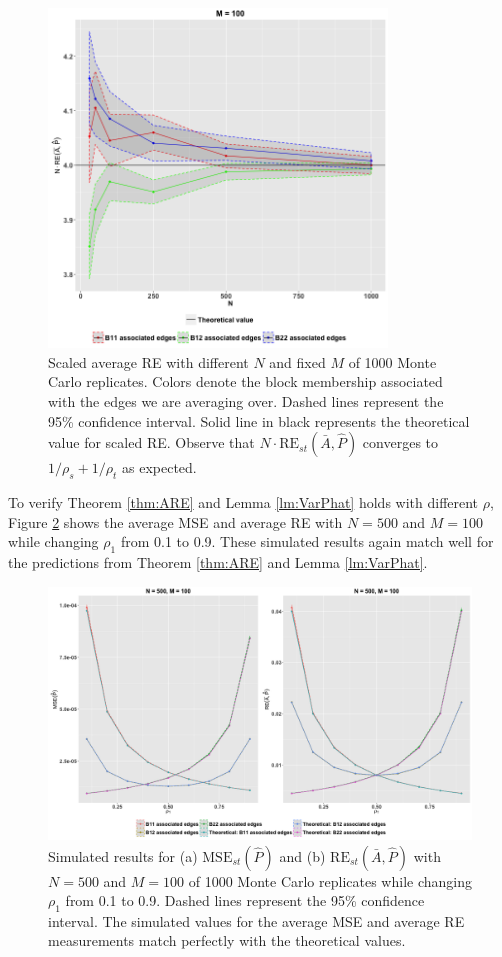 \begin{figure}[!htb]
	\centering
	\includegraphics[width=9cm]{RE.png}
	\caption{Scaled average RE with different $N$ and fixed $M$ of 1000 Monte Carlo replicates. Colors denote the block membership associated with the edges we are averaging over. Dashed lines represent the 95\% confidence interval. Solid line in black represents the theoretical value for scaled RE. Observe that $N \cdot \mathrm{RE}_{st}(\bar{A}, \hat{P})$ converges to $1/\rho_s + 1/\rho_t$ as expected.}
	\label{fig:RE}
\end{figure}




To verify Theorem \ref{thm:ARE} and Lemma \ref{lm:VarPhat} holds with different $\rho$, Figure \ref{fig:RErho} shows the average MSE and average RE with $N = 500$ and $M = 100$ while changing $\rho_1$ from 0.1 to 0.9. These simulated results again match well for the predictions from Theorem \ref{thm:ARE} and Lemma \ref{lm:VarPhat}.
\begin{figure}[!htb]
\centering
\includegraphics[width=14cm]{Rho.png}
\caption{Simulated results for (a) $\mathrm{MSE}_{st}(\hat{P})$ and (b) $\mathrm{RE}_{st}(\bar{A}, \hat{P})$ with $N = 500$ and $M = 100$ of 1000 Monte Carlo replicates while changing $\rho_1$ from 0.1 to 0.9. Dashed lines represent the 95\% confidence interval. The simulated values for the average MSE and average RE measurements match perfectly with the theoretical values.}
\label{fig:RErho}
\end{figure}





